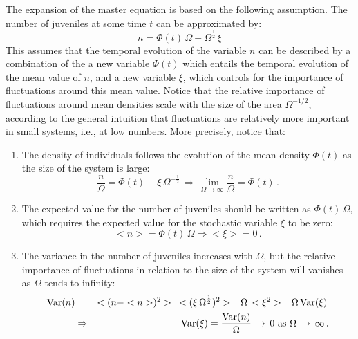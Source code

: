 The expansion of the master equation is based on the following assumption. The number of juveniles at some time $t$ can be approximated by:
\begin{equation}
\label{central}
n = \Phi(t)\,\Omega + \Omega^{\frac{1}{2}}\,\xi
\end{equation}
This assumes that the temporal evolution of the variable $n$ can be described by a combination of the a new variable $\Phi(t)$ which entails the temporal evolution of the mean value of $n$, and a new variable $\xi$, which controls for the importance of fluctuations around this mean value. Notice that the relative importance of fluctuations around mean densities scale with the size of the area $\Omega^{-1/2}$, according to the general intuition that fluctuations are relatively more important in small systems, i.e., at low numbers. More precisely, notice that:
\begin{enumerate}
\item The density of individuals follows the evolution of the mean density $\Phi(t)$ as the size of the system is large:
\begin{equation}
\frac{n}{\Omega}=\Phi(t)+\xi\,\Omega^{-\frac{1}{2}}\, \Rightarrow\, \lim_{\Omega \to \infty}\frac{n}{\Omega}=\Phi(t)\,.
\end{equation}    
\item The expected value for the number of juveniles should be written as $\Phi(t)\,\Omega$, which requires the expected value for the stochastic variable $\xi$ to be zero:
\begin{equation}
<n> = \Phi(t)\,\Omega \Rightarrow <\xi>=0\,.
\end{equation} 
\item The variance in the number of juveniles increases with $\Omega$, but the relative importance of fluctuations in relation to the size of the system will vanishes  as $\Omega$ tends to infinity:
\begin{eqnarray}
\textup{Var}(n)&=&<(n-<n>)^2>=<(\xi\,\Omega^{\frac{1}{2}})^2> = \Omega\,<\xi^2>=\Omega\,\textup{Var}(\xi)\,\nonumber\\
&\Rightarrow& \textup{Var}(\xi)=\frac{\textup{Var}(n)}{\Omega}\,\to\,0\,\,\textup{as}\,\,\Omega\,\to\,\infty\,. 
\end{eqnarray}
\end{enumerate}
 
